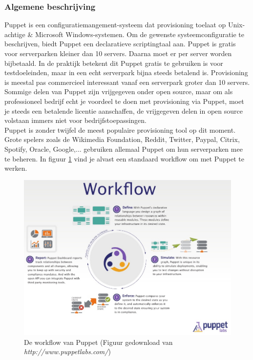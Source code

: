 \documentclass[a4paper,11pt]{article}
\theoremstyle{definition}
\begin{document}
\subsubsection{Algemene beschrijving}
Puppet is een configuratiemangement-systeem dat provisioning 
toelaat op Unix-achtige \& Microsoft Windows-systemen. Om de gewenste systeemconfiguratie 
te beschrijven, biedt Puppet een declaratieve scriptingtaal aan. Puppet is gratis 
voor serverparken kleiner dan 10 servers. Daarna moet er per server worden
bijbetaald. In de praktijk betekent dit Puppet gratis te gebruiken is voor testdoeleinden,
maar in een echt serverpark bijna steeds betalend is. Provisioning is  meestal pas commercieel 
interessant vanaf een serverpark groter dan 10 servers. Sommige delen van Puppet zijn vrijgegeven onder open source, maar om als
professioneel bedrijf echt je voordeel te doen met provisioning via Puppet, moet je steeds
een betalende licentie aanschaffen, de vrijgegeven delen in open source volstaan immers niet voor bedrijfstoepassingen.\\

\noindent Puppet is zonder twijfel de meest populaire provisioning tool op dit 
moment. Grote spelers zoals de Wikimedia Foundation, Reddit, Twitter, Paypal, 
Citrix, Spotify, Oracle, Google,... gebruiken allemaal Puppet om hun 
serverparken mee te beheren. In figuur \ref{workflow} vind je alvast een 
standaard workflow om met Puppet te werken.

\begin{figure}[h!]
  \centering
  \includegraphics[scale=0.6]{workflow.png}\caption{De workflow van Puppet (Figuur gedownload van \emph{http://www.puppetlabs.com/})}\label{workflow}
\end{figure}
\end{document}
